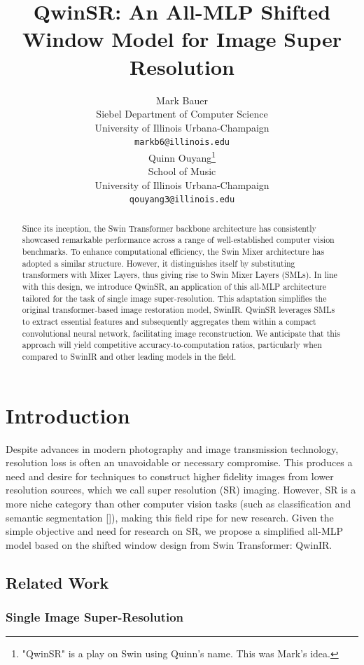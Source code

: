 \documentclass{article}
\title{QwinSR: An All-MLP Shifted Window Model for Image Super Resolution}
\author{
  Mark Bauer \\
  Siebel Department of Computer Science\\
  University of Illinois Urbana-Champaign\\
  \texttt{markb6@illinois.edu} \\
  \And
  Quinn Ouyang\thanks{"QwinSR" is a play on Swin using Quinn's name. This was Mark's idea.} \\
  School of Music \\
  University of Illinois Urbana-Champaign \\
  \texttt{qouyang3@illinois.edu} \\
}
\begin{document}
\maketitle

\begin{abstract}
    Since its inception, the Swin Transformer backbone architecture has consistently showcased remarkable performance across a range of well-established computer vision benchmarks. To enhance computational efficiency, the Swin Mixer architecture has adopted a similar structure. However, it distinguishes itself by substituting transformers with Mixer Layers, thus giving rise to Swin Mixer Layers (SMLs). In line with this design, we introduce QwinSR, an application of this all-MLP architecture tailored for the task of single image super-resolution. This adaptation simplifies the original transformer-based image restoration model, SwinIR. QwinSR leverages SMLs to extract essential features and subsequently aggregates them within a compact convolutional neural network, facilitating image reconstruction. We anticipate that this approach will yield competitive accuracy-to-computation ratios, particularly when compared to SwinIR and other leading models in the field.
\end{abstract}

\section{Introduction}

Despite advances in modern photography and image transmission technology, resolution loss is often an unavoidable or necessary compromise. This produces a need and desire for techniques to construct higher fidelity images from lower resolution sources, which we call super resolution (SR) imaging. However, SR is a more niche category than other computer vision tasks (such as classification and semantic segmentation []), making this field ripe for new research. Given the simple objective and need for research on SR, we propose a simplified all-MLP model based on the shifted window design from Swin Transformer: QwinIR.

\subsection{Related Work}

\subsubsection{Single Image Super-Resolution}
\end{document}
